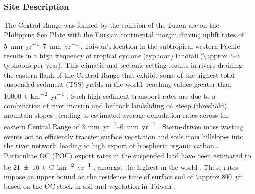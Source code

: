\subsubsection{Site Description}\label{Ch6SD1}

The Central Range was formed by the collision of the Luzon arc on the Philippine Sea Plate with the Eursian continental margin driving uplift rates of \SIrange{5}{7}{mm.yr^{-1}} \citep{Teng:1990tu,Dadson:2003kl}. Taiwan's location in the subtropical western Pacific results in a high frequency of tropical cyclone (typhoon) landfall (\numrange{\approx 2}{3} typhoons per year). This climatic and tectonic setting results in rivers draining the eastern flank of the Central Range that exhibit some of the highest total suspended sediment (TSS) yields in the world, reaching values greater than \SI{10000}{t.km^{-2}.yr^{-1}} \citep{Dadson:2003kl}. Such high sediment transport rates are due to a combination of river incision and bedrock landsliding on steep (threshold) mountain slopes \citep{Hovius:2000ht}, leading to estimated average denudation rates across the eastern Central Range of \SIrange{3}{6}{mm.yr^{-1}} \citep{Dadson:2003kl}. Storm-driven mass wasting events act to efficiently transfer surface vegetation and soils from hillslopes into the river network, leading to high export of biospheric organic carbon \citep[OC;][]{Hilton:2008fo}. Particulate OC (POC) export rates in the suspended load have been estimated to be \SI{21 \pm 10}{t.C.km^{-2}.yr^{-1}} \citep{Hilton:2012dt}, amongst the highest in the world \citep{Galy:2015fx}. These rates impose an upper bound on the residence time of surface soil of \SI{\approx 800}{yr} based on the OC stock in soil and vegetation in Taiwan \citep{Hilton:2012dt}.

